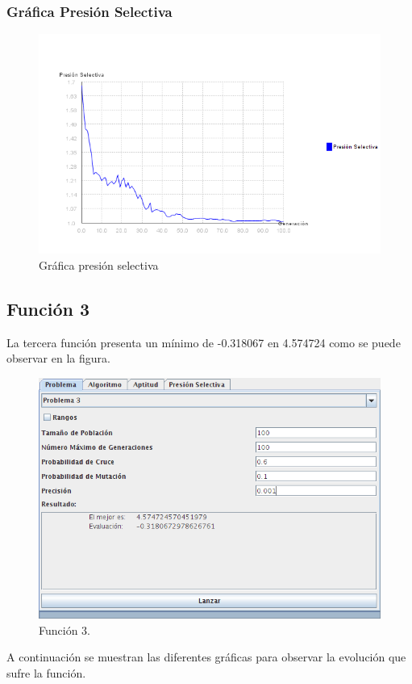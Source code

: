 \documentclass[12pt]{article}
\begin{document}
\subsubsection*{Gráfica Presión Selectiva}
\begin{figure}[H]
\centering
\includegraphics[scale=0.5]{graficas/F2inicial_presion}
\caption{Gráfica presión selectiva}
\label{fig}
\end{figure}
\newpage

\subsection{Función 3}
	La tercera función presenta un mínimo de -0.318067 en 4.574724 como se puede observar en la figura.
\begin{figure}[H]
\centering
\includegraphics[scale=0.5]{graficas/F3inicial}
\caption{Función 3.}
\label{fig}
\end{figure}
	A continuación se muestran las diferentes gráficas para observar la evolución que sufre la función.
\end{document}
